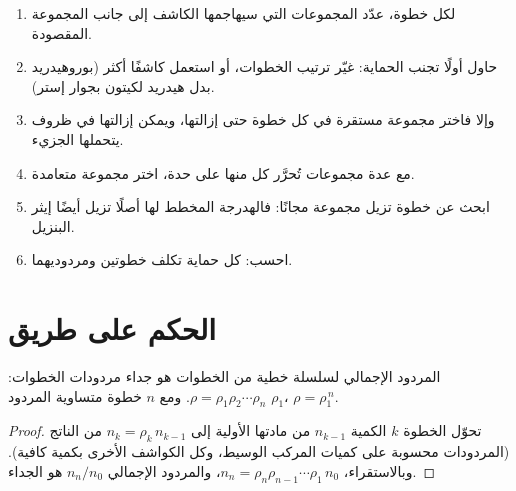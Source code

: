 \begin{method}\label{met:b2:retrosynthesis:protect-in-route}
\begin{enumerate}
  \item لكل خطوة، عدّد المجموعات التي سيهاجمها الكاشف إلى جانب المجموعة المقصودة.
  \item حاول أولًا تجنب الحماية: غيّر ترتيب الخطوات، أو استعمل كاشفًا أكثر 
        (بوروهيدريد بدل هيدريد لكيتون بجوار إستر).
  \item وإلا فاختر مجموعة مستقرة في كل خطوة حتى إزالتها، ويمكن إزالتها في ظروف
        يتحملها الجزيء.
  \item مع عدة مجموعات تُحرَّر كل منها على حدة، اختر مجموعة متعامدة.
  \item ابحث عن خطوة تزيل مجموعة مجانًا: فالهدرجة المخطط لها أصلًا تزيل أيضًا
        إيثر البنزيل.
  \item احسب: كل حماية تكلف خطوتين ومردوديهما.
\end{enumerate}
\end{method}

\section{الحكم على طريق}\label{sec:b2:retrosynthesis:judging}

\begin{proposition}\label{prop:b2:retrosynthesis:overall-yield}
المردود الإجمالي لسلسلة خطية من الخطوات هو جداء مردودات الخطوات:
$\rho = \rho_1 \rho_2 \cdots \rho_n$. ومع $n$ خطوة متساوية المردود $\rho_1$، $\rho = \rho_1^{\,n}$.
\end{proposition}

\begin{proof}
تحوّل الخطوة $k$ الكمية $n_{k-1}$ من مادتها الأولية إلى $n_k = \rho_k\, n_{k-1}$ من الناتج
(المردودات محسوبة على كميات المركب الوسيط، وكل الكواشف الأخرى بكمية كافية). وبالاستقراء،
$n_n = \rho_n \rho_{n-1} \cdots \rho_1\, n_0$، والمردود الإجمالي $n_n/n_0$ هو الجداء.
\end{proof}

